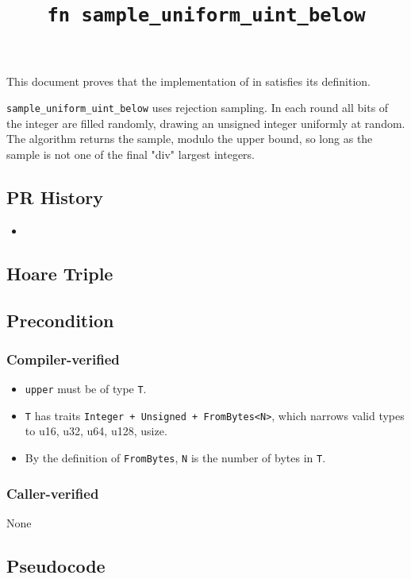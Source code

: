 \documentclass{article}
\title{\texttt{fn sample\_uniform\_uint\_below}}
\author{\MichaelShoemateAuthor}
\begin{document}
\maketitle

\contrib

This document proves that the implementation of  in 
satisfies its definition.

\texttt{sample\_uniform\_uint\_below} uses rejection sampling.
In each round all bits of the integer are filled randomly, drawing an unsigned integer uniformly at random.
The algorithm returns the sample, modulo the upper bound, so long as the sample is not one of the final "div" largest integers.

\subsection*{PR History}
\begin{itemize}
    \item {}
\end{itemize}

\subsection{Hoare Triple}
\subsection*{Precondition}
\subsubsection*{Compiler-verified}
\begin{itemize}
    \item \texttt{upper} must be of type \texttt{T}.
    \item \texttt{T} has traits \texttt{Integer + Unsigned + FromBytes<N>}, which narrows valid types to u16, u32, u64, u128, usize.
    \item By the definition of \texttt{FromBytes}, \texttt{N} is the number of bytes in \texttt{T}.
\end{itemize}

\subsubsection*{Caller-verified}
None

\subsection*{Pseudocode}
\end{document}
